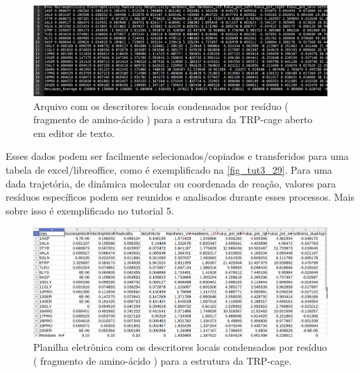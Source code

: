 \documentclass[a4paper,11pt]{refart}
\begin{document}
\hspace*{-\leftmarginwidth}
\begin{minipage}{\fullwidth}
	\begin{figure}[H]
		\begin{center}
			\includegraphics[width=6in]{images/tut3_img29}
			\caption{Arquivo com os descritores locais condensados por resíduo ( fragmento de amino-ácido ) para a estrutura da TRP-cage aberto em editor de texto.}
			\label{fig_tut3_28}
		\end{center}
	\end{figure}
\end{minipage}

Esses dados podem ser facilmente selecionados/copiados e transferidos para uma tabela de excel/libreoffice, como é exemplificado na \autoref{fig_tut3_29}. Para uma dada trajetória, de dinâmica molecular ou coordenada de reação, valores para resíduos específicos podem ser reunidos e analisados durante esses processos. Mais sobre isso é exemplificado no tutorial 5.

\hspace*{-\leftmarginwidth}
\begin{minipage}{\fullwidth}
	\begin{figure}[H]
		\begin{center}
			\includegraphics[width=5in]{images/tut3_img30}
			\caption{Planilha eletrônica com os descritores locais condensados por resíduo ( fragmento de amino-ácido ) para a estrutura da TRP-cage.}
			\label{fig_tut3_29}
		\end{center}
	\end{figure}
\end{minipage}
\end{document}
